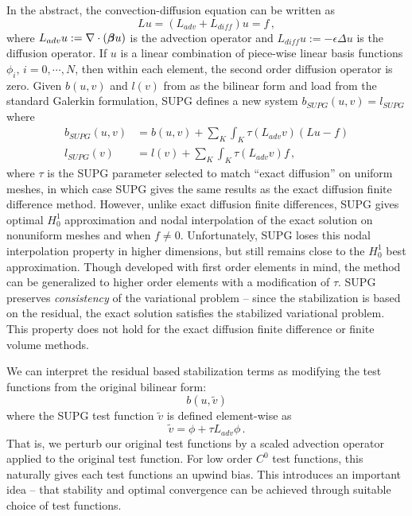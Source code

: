 \documentclass[Proposal.tex]{subfiles}
\begin{document}
In the abstract, the convection-diffusion equation can be written as 
\[
Lu=(L_{adv}+L_{diff})u=f\,,
\]
where $L_{adv}u:=\nabla\cdot(\boldsymbol\beta u)$ is the advection operator and $L_{diff}u:=-\epsilon\Delta u$ is the diffusion operator.
If $u$ is a linear combination of piece-wise linear basis functions $\phi_i,\,i=0,\cdots,N$, then within each element, the second order diffusion operator is zero.
Given $b(u,v)$ and $l(v)$ from as the bilinear form and load from the standard Galerkin formulation, SUPG defines a new system $b_{SUPG}(u,v)=l_{SUPG}$ where
\begin{align*}
	b_{SUPG}(u,v)&=b(u,v)+\sum_K\int_K\tau(L_{adv}v)(Lu-f)\\
	l_{SUPG}(v)&=l(v)+\sum_K\int_K\tau(L_{adv}v)f\,,
\end{align*}
where $\tau$ is the SUPG parameter selected to match ``exact diffusion'' on uniform meshes, in which case SUPG gives the same results as the 
exact diffusion finite difference method.
However, unlike exact diffusion finite differences, SUPG gives optimal $H_0^1$ approximation and nodal interpolation of the exact solution 
on nonuniform meshes and when $f\neq0$.
Unfortunately, SUPG loses this nodal interpolation property in higher dimensions, but still remains close to the $H_0^1$ best approximation.
Though developed with first order elements in mind, the method can be generalized to higher order elements with a modification of $\tau$.
SUPG preserves \emph{consistency} of the variational problem -- since the stabilization is based on the residual, the exact solution 
satisfies the stabilized variational problem. 
This property does not hold for the exact diffusion finite difference or finite volume methods.

We can interpret the residual based stabilization terms as modifying the test functions from the original bilinear form:
\[
b(u,\tilde v)
\]
where the SUPG test function $\tilde v$ is defined element-wise as
\[
\tilde v=\phi+\tau L_{adv}\phi\,.
\]
That is, we perturb our original test functions by a scaled advection operator applied to the original test function.
For low order $C^0$ test functions, this naturally gives each test functions an upwind bias.
This introduces an important idea -- that stability and optimal convergence can be achieved through suitable choice of test functions.
\end{document}
